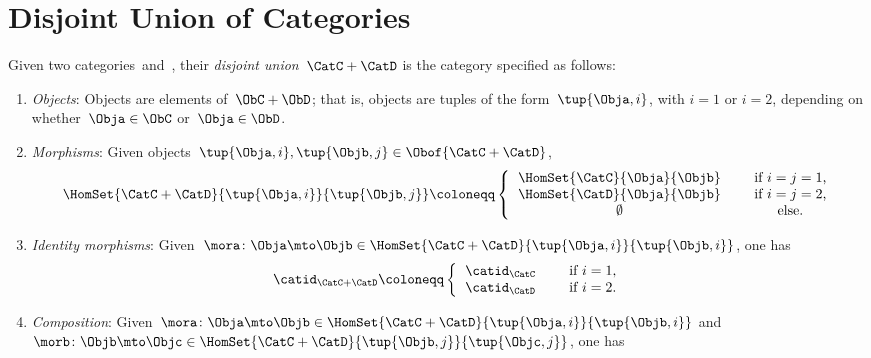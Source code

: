 
\section{Disjoint Union of Categories}

\begin{ctdefinition}
    \label{def:disjoint-union-category}
    Given two categories~\CatC and~\CatD, their \emph{disjoint union}~$\CatC + \CatD$ is the category specified as follows:
    \begin{enumerate}
        \item \emph{Objects}: Objects are elements of~$\ObC + \ObD$; that is, objects are tuples of the form~$\tup{\Obja, i}$, with $i=1$ or $i=2$, depending on whether~$\Obja \in \ObC$ or~$\Obja \in \ObD$.
        \item \emph{Morphisms}: Given objects~$\tup{\Obja, i}, \tup{\Objb, j} \in \Obof{\CatC + \CatD}$,
              \begin{equation}
                  \HomSet{\CatC + \CatD}{\tup{\Obja, i}}{\tup{\Objb, j}} \coloneqq
                  \left\{
                  \begin{tabular}{ccc}
                      $\HomSet{\CatC}{\Obja}{\Objb}$ &  & if $i=j = 1$,  \\
                      $\HomSet{\CatD}{\Obja}{\Objb}$ &  & if $i = j =2$, \\
                      $\emptyset$                    &  & else.
                  \end{tabular}
                  \right.
              \end{equation}
        \item \emph{Identity morphisms}: Given~$\mora\colon \Obja \mto \Objb\in \HomSet{\CatC + \CatD}{\tup{\Obja, i}}{\tup{\Objb, i}}$, one has
              \begin{equation}
                  \catid_{\CatC+\CatD} \coloneqq
                  \left\{
                  \begin{tabular}{ccc}
                      $\catid_\CatC$ &  & if $i=1$, \\
                      $\catid_\CatD$ &  & if $i=2$.
                  \end{tabular}
                  \right.
              \end{equation}
        \item \emph{Composition}: Given~$\mora\colon \Obja \mto \Objb\in \HomSet{\CatC + \CatD}{\tup{\Obja, i}}{\tup{\Objb, i}}$ and~$\morb\colon \Objb\mto \Objc\in \HomSet{\CatC + \CatD}{\tup{\Objb, j}}{\tup{\Objc, j}}$, one has

\end{enumerate}
\end{ctdefinition}
